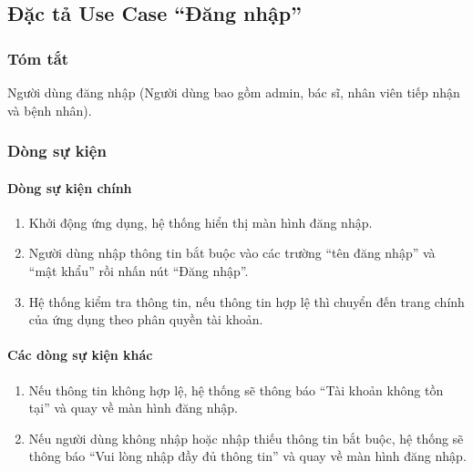 \subsection{Đặc tả Use Case ``Đăng nhập''}

\subsubsection{Tóm tắt}
Người dùng đăng nhập (Người dùng bao gồm admin, bác sĩ, nhân viên tiếp nhận và bệnh nhân).

\subsubsection{Dòng sự kiện}
\paragraph{\textbf{Dòng sự kiện chính}}
\begin{enumerate}
    \item Khởi động ứng dụng, hệ thống hiển thị màn hình đăng nhập.
    \item Người dùng nhập thông tin bắt buộc vào các trường ``tên đăng nhập'' và ``mật khẩu'' rồi nhấn nút ``Đăng nhập''.
    \item Hệ thống kiểm tra thông tin, nếu thông tin hợp lệ thì chuyển đến trang chính của ứng dụng theo phân quyền tài khoản.
\end{enumerate}

\paragraph{\textbf{Các dòng sự kiện khác}}
\begin{enumerate}
    \item Nếu thông tin không hợp lệ, hệ thống sẽ thông báo ``Tài khoản không tồn tại'' và quay về màn hình đăng nhập.
    \item Nếu người dùng không nhập hoặc nhập thiếu thông tin bắt buộc, hệ thống sẽ thông báo ``Vui lòng nhập đầy đủ thông tin'' và quay về màn hình đăng nhập.
\end{enumerate}

